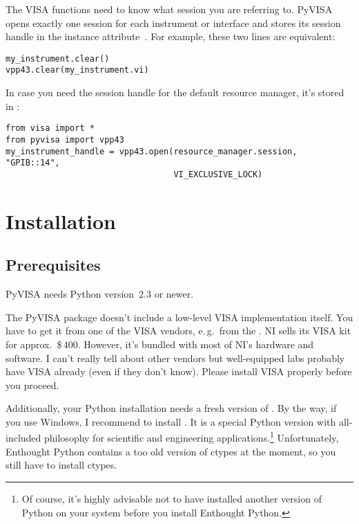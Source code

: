 \documentclass{howto}
\begin{document}
The VISA functions need to know what session you are referring to.  PyVISA
opens exactly one session for each instrument or interface and stores its
session handle in the instance attribute~.  For example, these two
lines are equivalent:
\begin{verbatim}
my_instrument.clear()
vpp43.clear(my_instrument.vi)
\end{verbatim}

In case you need the session handle for the default resource manager, it's
stored in :
\begin{verbatim}
from visa import *
from pyvisa import vpp43
my_instrument_handle = vpp43.open(resource_manager.session, "GPIB::14",
                                  VI_EXCLUSIVE_LOCK)
\end{verbatim}


\section{Installation}

\subsection{Prerequisites}

PyVISA needs Python version~2.3 or newer.

The PyVISA package doesn't include a low-level VISA implementation itself.  You
have to get it from one of the VISA vendors, e.\,g.\ from the .  NI sells its VISA kit for
approx.~\$\,400.  However, it's bundled with most of NI's hardware and
software.  I can't really tell about other vendors but well-equipped labs
probably have VISA already (even if they don't know).  Please install VISA
properly before you proceed.

Additionally, your Python installation needs a fresh version of
.  By the way,
if you use Windows, I recommend to install .  It is a special Python version
with all-included philosophy for scientific and engineering
applications.\footnote{Of course, it's highly advisable not to have installed
  another version of Python on your system before you install Enthought
  Python.}  Unfortunately, Enthought Python contains a too old version of
ctypes at the moment, so you still have to install ctypes.
\end{document}
